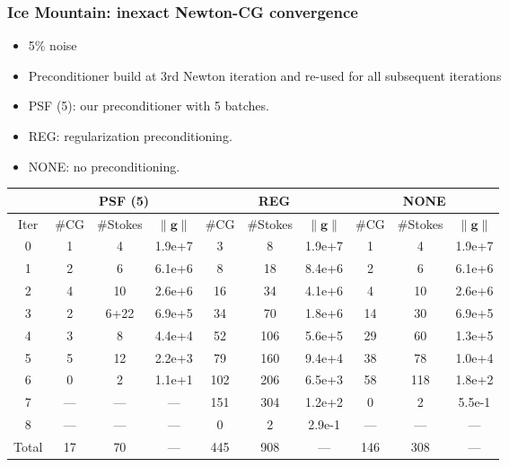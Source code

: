 \documentclass[10pt,final,xcolor=dvipsnames]{beamer}
\begin{document}
\begin{frame}
\frametitle{Ice Mountain: inexact Newton-CG convergence}
\begin{itemize}
	\item 5\% noise
	\item Preconditioner build at 3rd Newton iteration and re-used for all subsequent iterations
	\item PSF (5): our preconditioner with 5 batches.
	\item REG: regularization preconditioning.
	\item NONE: no preconditioning.
\end{itemize}
\vspace{0.5em}
	{\footnotesize
	\begin{center}
		\begingroup
		\setlength{\tabcolsep}{3pt}
		\renewcommand{\arraystretch}{1.1}
		\begin{tabular}{c| c c c | c c c | c c c}
			&  \multicolumn{3}{|c|}{PSF (5)} & \multicolumn{3}{|c|}{REG} & \multicolumn{3}{|c}{NONE} \\
			\hline
			Iter & 
			\#CG & \#Stokes & $\|\mathbf{g}\|$ & 
			\#CG & \#Stokes & $\|\mathbf{g}\|$ & 
			\#CG & \#Stokes & $\|\mathbf{g}\|$ \\
			0 &
			1 & 4 & 1.9e+7 &
			3 & 8 & 1.9e+7 &
			1 & 4 & 1.9e+7 \\
			1 &
			2 & 6  & 6.1e+6 &
			8 & 18 & 8.4e+6 &
			2 & 6  & 6.1e+6 \\
			2 &
			4 & 10 & 2.6e+6 &
			16 & 34 & 4.1e+6 &
			4 & 10 & 2.6e+6 \\
			3 &
			2 & 6+22 & 6.9e+5 &
			34 & 70 & 1.8e+6 &
			14 & 30 & 6.9e+5 \\
			4 &
			3 & 8 & 4.4e+4 &
			52 & 106 & 5.6e+5 &
			29 & 60 & 1.3e+5 \\
			5 &
			5 & 12 & 2.2e+3 &
			79 & 160 & 9.4e+4 &
			38 & 78 & 1.0e+4 \\
			6 &
			0 & 2 & 1.1e+1 &
			102 & 206 & 6.5e+3 &
			58 & 118 & 1.8e+2 \\
			7 &
			--- & --- & --- &
			151 & 304 & 1.2e+2 &
			0 & 2 & 5.5e-1 \\
			8 & 
			--- & --- & --- &
			0 & 2 & 2.9e-1 &
			--- & --- & --- \\
			\hline
			Total & 
			17 & 70 & --- &
			445 & 908 & --- &
			146 & 308 & --- \\
		\end{tabular}
		\endgroup
	\end{center}
}
\end{frame}
\end{document}
